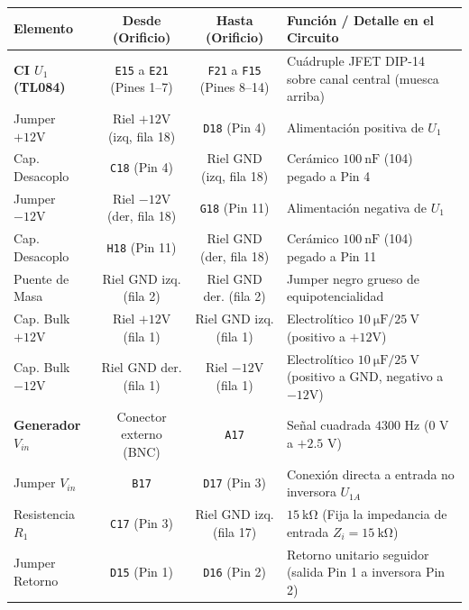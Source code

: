 \documentclass[10pt, a4paper]{article}
\begin{document}
\begin{center}
\small
\renewcommand{\arraystretch}{1.08}
\begin{tabularx}{\textwidth}{l c c X}
\toprule
\textbf{Elemento} & \textbf{Desde (Orificio)} & \textbf{Hasta (Orificio)} & \textbf{Función / Detalle en el Circuito} \\
\midrule
\rowcolor{softgray} \textbf{CI $U_1$ (TL084)} & \texttt{E15} a \texttt{E21} (Pines 1--7) & \texttt{F21} a \texttt{F15} (Pines 8--14) & Cuádruple JFET DIP-14 sobre canal central (muesca arriba) \\
Jumper $+12\text{V}$ & Riel $+12\text{V}$ (izq, fila 18) & \texttt{D18} (Pin 4) & Alimentación positiva de $U_1$ \\
\rowcolor{softgray} Cap. Desacoplo & \texttt{C18} (Pin 4) & Riel GND (izq, fila 18) & Cerámico $\SI{100}{\nano\farad}$ (104) pegado a Pin 4 \\
Jumper $-12\text{V}$ & Riel $-12\text{V}$ (der, fila 18) & \texttt{G18} (Pin 11) & Alimentación negativa de $U_1$ \\
\rowcolor{softgray} Cap. Desacoplo & \texttt{H18} (Pin 11) & Riel GND (der, fila 18) & Cerámico $\SI{100}{\nano\farad}$ (104) pegado a Pin 11 \\
Puente de Masa & Riel GND izq. (fila 2) & Riel GND der. (fila 2) & Jumper negro grueso de equipotencialidad \\
Cap. Bulk $+12\text{V}$ & Riel $+12\text{V}$ (fila 1) & Riel GND izq. (fila 1) & Electrolítico $\SI{10}{\micro\farad} / \SI{25}{\volt}$ (positivo a $+12\text{V}$) \\
\rowcolor{softgray} Cap. Bulk $-12\text{V}$ & Riel GND der. (fila 1) & Riel $-12\text{V}$ (fila 1) & Electrolítico $\SI{10}{\micro\farad} / \SI{25}{\volt}$ (positivo a GND, negativo a $-12\text{V}$) \\
\midrule
\textbf{Generador $V_{in}$} & Conector externo (BNC) & \texttt{A17} & Señal cuadrada $4300\text{ Hz}$ ($0\text{ V}$ a $+2.5\text{ V}$) \\
\rowcolor{softgray} Jumper $V_{in}$ & \texttt{B17} & \texttt{D17} (Pin 3) & Conexión directa a entrada no inversora $U_{1A}$ \\
Resistencia $R_1$ & \texttt{C17} (Pin 3) & Riel GND izq. (fila 17) & $\SI{15}{\kilo\ohm}$ (Fija la impedancia de entrada $Z_i = \SI{15}{\kilo\ohm}$) \\
\rowcolor{softgray} Jumper Retorno & \texttt{D15} (Pin 1) & \texttt{D16} (Pin 2) & Retorno unitario seguidor (salida Pin 1 a inversora Pin 2) \\

\end{tabularx}
\end{center}
\end{document}
